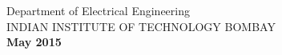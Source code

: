 \begin{titlepage}
\begin{center}
	
	\vspace{-0.2in}
	\large{%
	Department of Electrical Engineering\\
	INDIAN INSTITUTE OF TECHNOLOGY BOMBAY\\
	\textbf{May 2015}
	}
	
    \end{center}
\end{titlepage}
